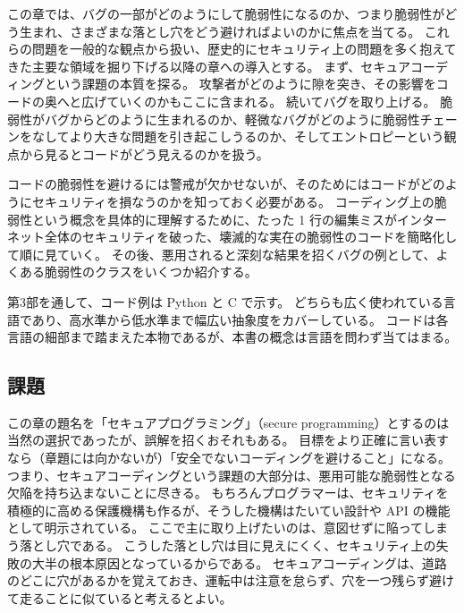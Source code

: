 \documentclass[uplatex]{jsarticle}
\begin{document}
この章では、バグの一部がどのようにして脆弱性になるのか、つまり脆弱性がどう生まれ、さまざまな落とし穴をどう避ければよいのかに焦点を当てる。
これらの問題を一般的な観点から扱い、歴史的にセキュリティ上の問題を多く抱えてきた主要な領域を掘り下げる以降の章への導入とする。
まず、セキュアコーディングという課題の本質を探る。
攻撃者がどのように隙を突き、その影響をコードの奥へと広げていくのかもここに含まれる。
続いてバグを取り上げる。
脆弱性がバグからどのように生まれるのか、軽微なバグがどのように脆弱性チェーンをなしてより大きな問題を引き起こしうるのか、そしてエントロピーという観点から見るとコードがどう見えるのかを扱う。

コードの脆弱性を避けるには警戒が欠かせないが、そのためにはコードがどのようにセキュリティを損なうのかを知っておく必要がある。
コーディング上の脆弱性という概念を具体的に理解するために、たった 1 行の編集ミスがインターネット全体のセキュリティを破った、壊滅的な実在の脆弱性のコードを簡略化して順に見ていく。
その後、悪用されると深刻な結果を招くバグの例として、よくある脆弱性のクラスをいくつか紹介する。

第3部を通して、コード例は Python と C で示す。
どちらも広く使われている言語であり、高水準から低水準まで幅広い抽象度をカバーしている。
コードは各言語の細部まで踏まえた本物であるが、本書の概念は言語を問わず当てはまる。

\subsection{課題}

この章の題名を「セキュアプログラミング」（secure programming）とするのは当然の選択であったが、誤解を招くおそれもある。
目標をより正確に言い表すなら（章題には向かないが）「安全でないコーディングを避けること」になる。
つまり、セキュアコーディングという課題の大部分は、悪用可能な脆弱性となる欠陥を持ち込まないことに尽きる。
もちろんプログラマーは、セキュリティを積極的に高める保護機構も作るが、そうした機構はたいてい設計や API の機能として明示されている。
ここで主に取り上げたいのは、意図せずに陥ってしまう落とし穴である。
こうした落とし穴は目に見えにくく、セキュリティ上の失敗の大半の根本原因となっているからである。
セキュアコーディングは、道路のどこに穴があるかを覚えておき、運転中は注意を怠らず、穴を一つ残らず避けて走ることに似ていると考えるとよい。
\end{document}
